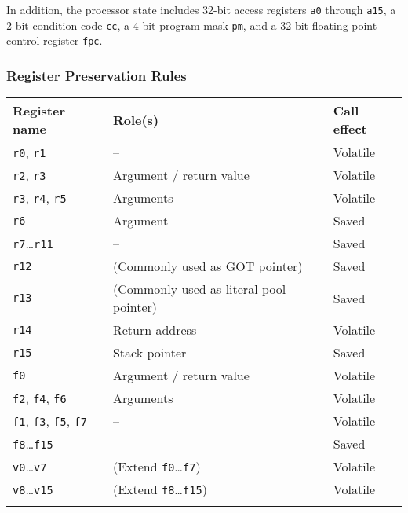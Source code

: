\documentclass[english,11pt,twoside,toc=bib,toc=idx]{scrreprt}
\newenvironment{DIFnomarkup}{}{} %
\begin{document}
In addition, the processor state includes 32-bit access registers
\texttt{a0} through \texttt{a15}, a 2-bit condition
code \texttt{cc}, a 4-bit program mask \texttt{pm},
and a 32-bit floating-point control register \texttt{fpc}.

\subsubsection{Register Preservation Rules}
\begin{table}
  \centering
  \begin{DIFnomarkup}
  \begin{threeparttable}
    \begin{tabularx}{\textwidth}{lXl}
      \toprule
      Register name & Role(s) & Call effect\tnote{\dagger} \\
      \midrule
      \texttt{r0}, \texttt{r1} & -- & Volatile \\
      \texttt{r2}{\ifzseries\else , \texttt{r3}\fi}&
      Argument / return value & Volatile \\
      {\ifzseries\texttt{r3}, \fi}\texttt{r4}, \texttt{r5} &
      Arguments & Volatile \\
      \texttt{r6} & Argument & Saved \\
      \texttt{r7}…\texttt{r11} & -- & Saved \\
      \texttt{r12} & (Commonly used as GOT pointer) & Saved \\
      \texttt{r13} & (Commonly used as literal pool pointer) & Saved \\
      \texttt{r14} & Return address & Volatile \\
      \texttt{r15} & Stack pointer & Saved \\
      \texttt{f0} & Argument / return value & Volatile \\
      \ifzseries %
      \texttt{f2}, \texttt{f4}, \texttt{f6} & Arguments & Volatile \\
      \texttt{f1}, \texttt{f3}, \texttt{f5}, \texttt{f7} & -- & Volatile \\
      \texttt{f8}…\texttt{f15} & -- & Saved \\
      \texttt{v0}…\texttt{v7} & (Extend \texttt{f0}…\texttt{f7}) & Volatile \\
      \texttt{v8}…\texttt{v15} & (Extend \texttt{f8}…\texttt{f15}) &
      Volatile\tnote{\dagger\dagger} \\
      \else %

\end{tabularx}
\end{threeparttable}
\end{DIFnomarkup}
\end{table}
\end{document}

